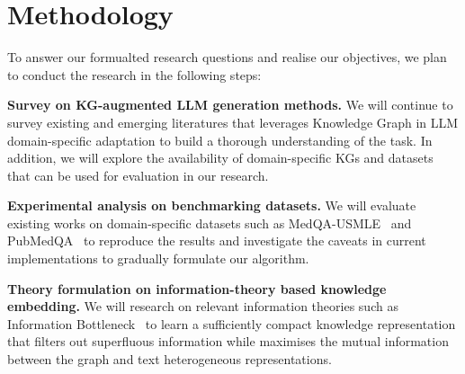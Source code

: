 \section*{Methodology}
To answer our formualted research questions and realise our objectives, we plan to conduct the research in the following steps:

\textbf{Survey on KG-augmented LLM generation methods. } 
We will continue to survey existing and emerging literatures that leverages Knowledge Graph in LLM domain-specific adaptation to build a thorough understanding of the task. 
In addition, we will explore the availability of domain-specific KGs and datasets that can be used for evaluation in our research.

\textbf{Experimental analysis on benchmarking datasets. } 
We will evaluate existing works on domain-specific datasets such as MedQA-USMLE~\parencite{medqa} and PubMedQA~\parencite{pubmedqa} to reproduce the results and investigate the caveats in current implementations to gradually formulate our algorithm.

\textbf{Theory formulation on information-theory based knowledge embedding. } 
We will research on relevant information theories such as Information Bottleneck~\parencite{IB, vib, gib} to learn a sufficiently compact knowledge representation that filters out superfluous information while maximises the mutual information between the graph and text heterogeneous representations.

